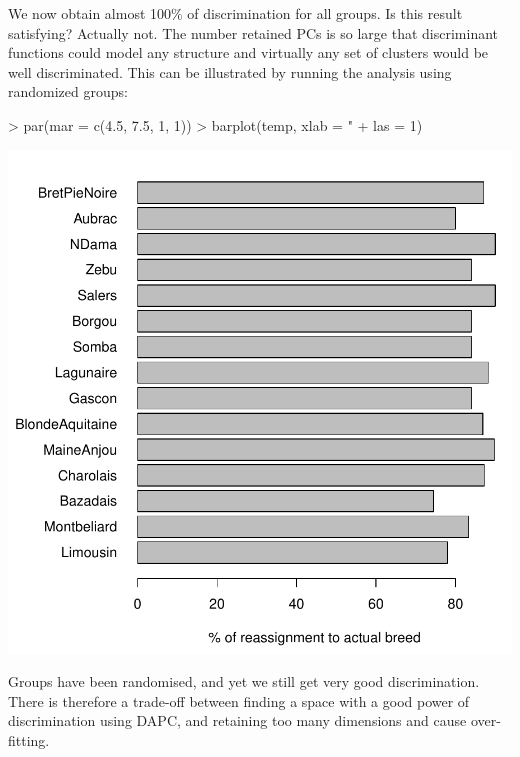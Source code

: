 \documentclass{article}
\begin{document}
\noindent We now obtain almost 100\% of discrimination for all groups.
Is this result satisfying? Actually not.
The number retained PCs is so large that discriminant functions could model any structure and
virtually any set of clusters would be well discriminated.
This can be illustrated by running the analysis using randomized groups:
\begin{Schunk}
\end{Schunk}
\begin{Schunk}
\begin{Sinput}
> par(mar = c(4.5, 7.5, 1, 1))
> barplot(temp, xlab = "%
+     las = 1)
\end{Sinput}
\end{Schunk}
\includegraphics{figs/dapc-031}

\noindent
Groups have been randomised, and yet we still get very good discrimination.
There is therefore a trade-off between finding a space with a good power of discrimination using
DAPC, and retaining too many dimensions and cause over-fitting.
\end{document}
